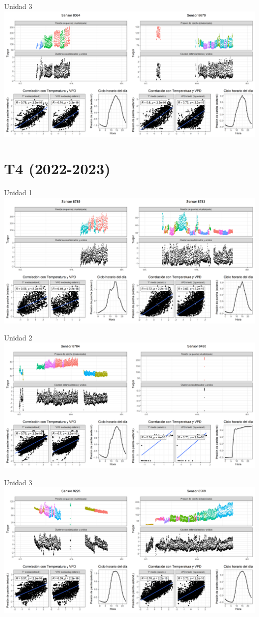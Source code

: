 \documentclass[
  letterpaper,
  DIV=11,
  numbers=noendperiod]{scrreprt}
\begin{document}
Unidad 3
\includegraphics{figuras/03_turgor_union/2022_2023_La_Esperanza_T3_Unidad_3.png}

\chapter{T4 (2022-2023)}

Unidad 1
\includegraphics{figuras/03_turgor_union/2022_2023_La_Esperanza_T4_Unidad_1.png}

Unidad 2
\includegraphics{figuras/03_turgor_union/2022_2023_La_Esperanza_T4_Unidad_2.png}

Unidad 3
\includegraphics{figuras/03_turgor_union/2022_2023_La_Esperanza_T4_Unidad_3.png}
\end{document}
